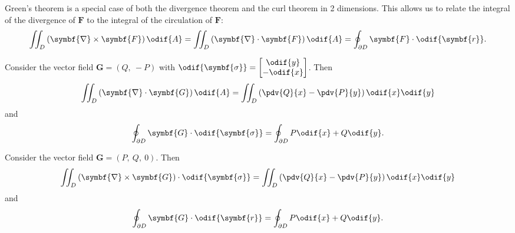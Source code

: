 \documentclass{article}
\begin{document}
Green's theorem is a special case of both the divergence theorem and
the curl theorem in 2 dimensions. This allows us to relate the integral
of the divergence of \(\symbf{F}\) to the integral of the circulation
of \(\symbf{F}\):
\begin{equation*}
    \iint_D \left( \symbf{\nabla} \times \symbf{F} \right) \odif{A} = \iint_D \left( \symbf{\nabla} \cdot \symbf{F} \right) \odif{A} = \oint_{\partial D} \symbf{F} \cdot \odif{\symbf{r}}.
\end{equation*}
\begin{corollary}
    Consider the vector field \(\symbf{G} = \left( Q,\: -P \right)\)
    with \(\odif{\symbf{\sigma}} =
    \begin{bmatrix}
        \odif{y} \\
        -\odif{x}
    \end{bmatrix}
    \).
    Then
    \begin{equation*}
        \iint_D \left( \symbf{\nabla} \cdot \symbf{G} \right) \odif{A} = \iint_D \left( \pdv{Q}{x} - \pdv{P}{y} \right) \odif{x} \odif{y}
    \end{equation*}
    and
    \begin{equation*}
        \oint_{\partial D} \symbf{G} \cdot \odif{\symbf{\sigma}} = \oint_{\partial D} P \odif{x} + Q \odif{y}.
    \end{equation*}
\end{corollary}
\begin{corollary}
    Consider the vector field \(\symbf{G} = \left( P,\: Q,\: 0 \right)\).
    Then
    \begin{equation*}
        \iint_D \left( \symbf{\nabla} \times \symbf{G} \right) \cdot \odif{\symbf{\sigma}} = \iint_D \left( \pdv{Q}{x} - \pdv{P}{y} \right) \odif{x} \odif{y}
    \end{equation*}
    and
    \begin{equation*}
        \oint_{\partial D} \symbf{G} \cdot \odif{\symbf{r}} = \oint_{\partial D} P \odif{x} + Q \odif{y}.
    \end{equation*}
\end{corollary}
\end{document}
